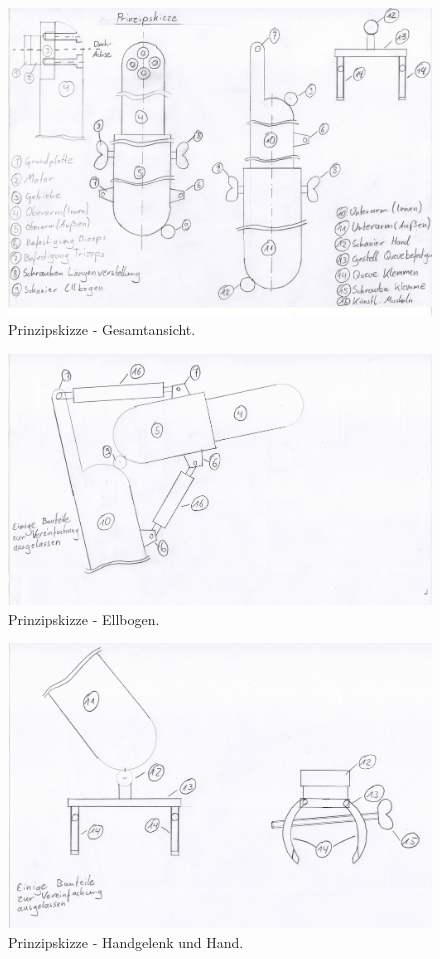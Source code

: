 	\begin{figure}[h]
		\centering
		\includegraphics[width=\textwidth]{"Abb/Prinzipskizze Gesamtansicht"}
		\caption[Prinzipskizze - Gesamtansicht]{Prinzipskizze - Gesamtansicht.}
		\label{fig:prinzipskizze-gesamtansicht}
	\end{figure}

	\begin{figure}[h]
		\centering
		\includegraphics[width=\textwidth]{"Abb/Prinzipskizze Ellbogen"}
		\caption[Prinzipskizze - Ellbogen]{Prinzipskizze - Ellbogen.}
		\label{fig:prinzipskizze-ellbogen}
	\end{figure}

	\begin{figure}[h]
		\centering
		\includegraphics[width=\textwidth]{"Abb/Prinzipskizze Handgelenk und Hand"}
		\caption[Prinzipskizze - Handgelenk und Hand]{Prinzipskizze - Handgelenk und Hand.}
		\label{fig:prinzipskizze-handgelenk-und-hand}
	\end{figure}

